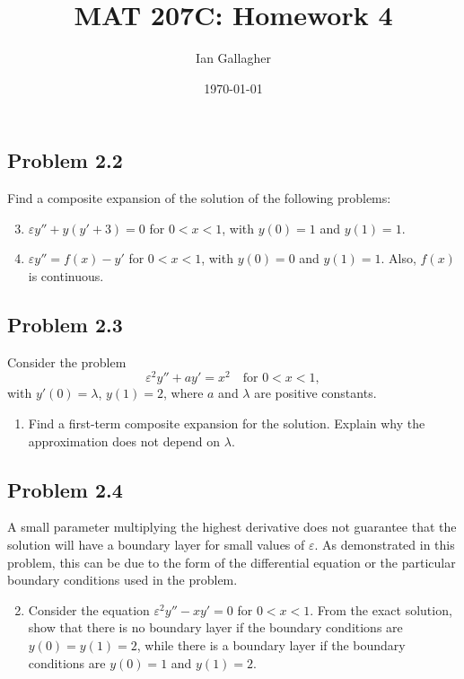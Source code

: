 \documentclass[11pt]{amsart}
\title{MAT 207C: Homework 4}
\author{Ian Gallagher}
\date{\today}
\begin{document}
\maketitle

\subsection*{Problem 2.2}
Find a composite expansion of the solution of the following problems:
\begin{enumerate}[label=(\alph*)]
  \setcounter{enumi}{2}
  \item $\varepsilon y'' + y(y' + 3) = 0$ for $0 < x < 1$, with $y(0) = 1$ and
    $y(1) = 1$.

  \item $\varepsilon y'' = f(x) - y'$ for $0 < x < 1$, with $y(0) = 0$ and $y(1)
    = 1$. Also, $f(x)$ is continuous.
\end{enumerate}

\subsection*{Problem 2.3}
Consider the problem
\[
\varepsilon^2 y'' + a y' = x^2 \quad \text{for } 0 < x < 1,
\]
with $y'(0) = \lambda$, $y(1) = 2$, where $a$ and $\lambda$ are positive constants.
\begin{enumerate}[label=(\alph*)]
  \item Find a first-term composite expansion for the solution. Explain why the
    approximation does not depend on $\lambda$.
\end{enumerate}

\subsection*{Problem 2.4}
A small parameter multiplying the highest derivative does not guarantee that the
solution will have a boundary layer for small values of $\varepsilon$. As
demonstrated in this problem, this can be due to the form of the differential
equation or the particular boundary conditions used in the problem.
\begin{enumerate}[label=(\alph*)]
  \setcounter{enumi}{1}
  \item Consider the equation $\varepsilon^2 y'' - x y' = 0$ for $0 < x < 1$.
    From the exact solution, show that there is no boundary layer if the
    boundary conditions are $y(0) = y(1) = 2$, while there is a boundary layer
    if the boundary conditions are $y(0) = 1$ and $y(1) = 2$.
\end{enumerate}
\end{document}
